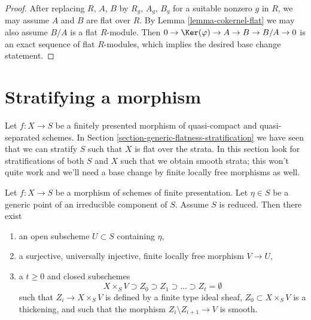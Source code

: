 \begin{proof}
\medskip\noindent
After replacing $R$, $A$, $B$ by $R_g$, $A_g$, $B_g$ for a suitable
nonzero $g$ in $R$, we may assume $A$ and $B$ are flat over $R$.
By Lemma \ref{lemma-cokernel-flat}
we may also assume $B/A$ is a flat $R$-module.
Then $0 \to \Ker(\varphi) \to A \to B \to B/A \to 0$
is an exact sequence of flat $R$-modules, which implies
the desired base change statement.
\end{proof}






\section{Stratifying a morphism}
\label{section-stratifying-morphisms}

\noindent
Let $f : X \to S$ be a finitely presented morphism of quasi-compact
and quasi-separated schemes.
In Section \ref{section-generic-flatness-stratification}
we have seen that we can stratify $S$ such that $X$ is flat
over the strata. In this section look for stratifications of both $S$
and $X$ such that we obtain smooth strata; this won't quite work and
we'll need a base change by finite locally free morphisms as well.

\begin{lemma}
\label{lemma-smoothness-stratification-at-generic-point}
Let $f : X \to S$ be a morphism of schemes of finite presentation.
Let $\eta \in S$ be a generic point of an irreducible component of $S$.
Assume $S$ is reduced. Then there exist
\begin{enumerate}
\item an open subscheme $U \subset S$ containing $\eta$,
\item a surjective, universally injective, finite locally free
morphism $V \to U$,
\item a $t \geq 0$ and closed subschemes
$$
X \times_S V \supset Z_0 \supset Z_1 \supset \ldots \supset Z_t = \emptyset
$$
such that $Z_i \to X \times_S V$ is defined by a finite type ideal sheaf,
$Z_0 \subset X \times_S V$ is a thickening, and such that the morphism
$Z_i \setminus Z_{i + 1} \to V$ is smooth.
\end{enumerate}
\end{lemma}

